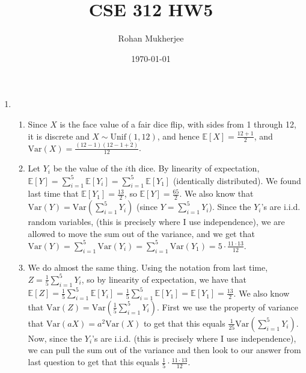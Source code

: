 \documentclass[12pt]{article}
\title{CSE 312 HW5}
\date{\today}
\author{Rohan Mukherjee}
\newcommand{\E}{\mathbb{E}}
\newcommand{\Var}{\mathrm{Var}}
\begin{document}
	\maketitle
	\begin{enumerate}[leftmargin=\labelsep]
		\item \begin{enumerate}
			\item Since $X$ is the face value of a fair dice flip, with sides from 1 through 12, it is discrete and $X \sim \mathrm{Unif}(1, 12)$, and hence $\E[X] = \frac{12+1}{2}$, and $\Var(X) = \frac{(12-1)(12-1+2)}{12}$.
			
			\item Let $Y_i$ be the value of the $i$th dice. By linearity of expectation, $\E[Y] = \sum_{i=1}^5 \E[Y_i] = \sum_{i=1}^5 \E[Y_1]$ (identically distributed). We found last time that $\E[Y_1] = \frac{13}{2}$, so $\E[Y] = \frac{65}{2}$. We also know that $\Var(Y) = \Var(\sum_{i=1}^5 Y_i)$ (since $Y = \sum_{i=1}^5 Y_i$). Since the $Y_i$'s are i.i.d. random variables, (this is precisely where I use independence), we are allowed to move the sum out of the variance, and we get that $\Var(Y) = \sum_{i=1}^5 \Var(Y_i) = \sum_{i=1}^5 \Var(Y_1) = 5 \cdot \frac{11 \cdot 13}{12}$.
			
			\item We do almost the same thing. Using the notation from last time, $Z = \frac15 \sum_{i=1}^5 Y_i$, so by linearity of expectation, we have that $\E[Z] = \frac15 \sum_{i=1}^5 \E[Y_i] = \frac15 \sum_{i=1}^5 \E[Y_1] = \E[Y_1] = \frac{13}{2}$. We also know that $\Var(Z) = \Var(\frac15 \sum_{i=1}^5 Y_i)$. First we use the property of variance that $\Var(aX) = a^2\Var(X)$ to get that this equals $\frac1{25} \Var(\sum_{i=1}^5 Y_i)$. Now, since the $Y_i$'s are i.i.d. (this is precisely where I use independence), we can pull the sum out of the variance and then look to our answer from last question to get that this equals $\frac15 \cdot \frac{11 \cdot 13}{12}$.
		\end{enumerate}
	

\end{enumerate}
\end{document}
